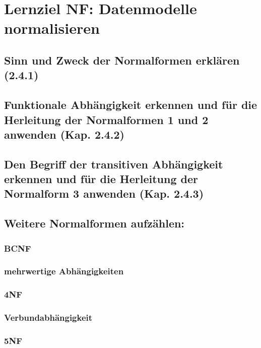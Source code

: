 \section{Lernziel NF: Datenmodelle normalisieren}

\subsection{Sinn und Zweck der Normalformen erklären (2.4.1)}

\subsection{Funktionale Abhängigkeit erkennen und für die Herleitung der Normalformen 1 und 2 anwenden (Kap. 2.4.2)}

\subsection{Den Begriff der transitiven Abhängigkeit erkennen und für die Herleitung der Normalform 3 anwenden (Kap. 2.4.3)}

\subsection{Weitere Normalformen aufzählen:}

\subsubsection{BCNF}

\subsubsection{mehrwertige Abhängigkeiten}

\subsubsection{4NF}

\subsubsection{Verbundabhängigkeit}

\subsubsection{5NF}